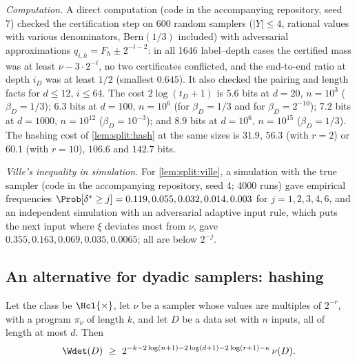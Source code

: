 \emph{Computation.} A direct computation (code in the accompanying repository, seed 7) checked the certification step on 600 random samplers ($|Y|\le4$, rational values with various denominators, Bern$(1/3)$ included) with adversarial approximations $q_{i,h}=F_h\pm2^{-i-2}$: in all 1646 label--depth cases the certified mass was at least $\nu-3\cdot2^{-i}$, no two certificates conflicted, and the end-to-end ratio at depth $i_D$ was at least $1/2$ (smallest $0.645$). It also checked the pairing and length facts for $d\le12$, $i\le64$. The cost $2\log(t_D+1)$ is $5.6$ bits at $d=20$, $n=10^3$ ($\beta_D=1/3$); $6.3$ bits at $d=100$, $n=10^6$ (for $\beta_D=1/3$ and for $\beta_D=2^{-10}$); $7.2$ bits at $d=1000$, $n=10^{12}$ ($\beta_D=10^{-3}$); and $8.9$ bits at $d=10^6$, $n=10^{15}$ ($\beta_D=1/3$). The hashing cost of \cref{lem:split:hash} at the same sizes is $31.9$, $56.3$ (with $r=2$) or $60.1$ (with $r=10$), $106.6$ and $142.7$ bits.

\emph{Ville's inequality in simulation.} For \cref{lem:split:ville}, a simulation with the true sampler (code in the accompanying repository, seed 4; 4000 runs) gave empirical frequencies $\Prob[\delta^*\ge j]=0.119,0.055,0.032,0.014,0.003$ for $j=1,2,3,4,6$, and an independent simulation with an adversarial adaptive input rule, which puts the next input where $\xi$ deviates most from $\nu$, gave $0.355,0.163,0.069,0.035,0.0065$; all are below $2^{-j}$.

\subsection{An alternative for dyadic samplers: hashing}\label{app:split:hash}

\begin{lemma}\label{lem:split:hash}
Let the class be $\Hcl{\times}$, let $\nu$ be a sampler whose values are multiples of $2^{-r}$, with a program $\pi_\nu$ of length $k$, and let $D$ be a data set with $n$ inputs, all of length at most $d$. Then
\[
\Wdet(D)\ \ge\ 2^{-k-2\log(n+1)-2\log(d+1)-2\log(r+1)-\kappa}\,\nu(D).
\]
\end{lemma}

